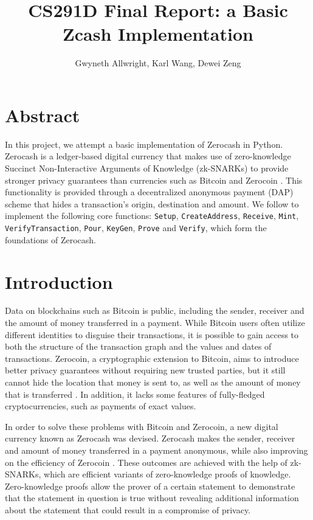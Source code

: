 \documentclass{article}
\begin{document}
\title{CS291D Final Report: a Basic Zcash Implementation}
\author{Gwyneth Allwright, Karl Wang, Dewei Zeng}

\maketitle

\section*{Abstract}
In this project, we attempt a basic implementation of Zerocash \cite{zerocash} in Python. Zerocash is a ledger-based digital currency that makes use of zero-knowledge Succinct Non-Interactive Arguments of Knowledge (zk-SNARKs) to provide stronger privacy guarantees than currencies such as Bitcoin \cite{bitcoin} and Zerocoin \cite{zerocoin}. This functionality is provided through a decentralized anonymous payment (DAP) scheme that hides a transaction's origin, destination and amount. We follow \cite{zerocash} to implement the following core functions: \texttt{Setup}, \texttt{CreateAddress}, \texttt{Receive}, \texttt{Mint}, \texttt{VerifyTransaction}, \texttt{Pour}, \texttt{KeyGen}, \texttt{Prove} and \texttt{Verify}, which form the foundations of Zerocash.

\tableofcontents

\newpage

\section{Introduction}
Data on blockchains such as Bitcoin is public, including the sender, receiver and the amount of money transferred in a payment. While Bitcoin users often utilize different identities to disguise their transactions, it is possible to gain access to both the structure of the transaction graph and the values and dates of transactions. Zerocoin, a cryptographic extension to Bitcoin, aims to introduce better privacy guarantees without requiring new trusted parties, but it still cannot hide the location that money is sent to, as well as the amount of money that is transferred \cite{zerocoin}. In addition, it lacks some features of fully-fledged cryptocurrencies, such as payments of exact values.

In order to solve these problems with Bitcoin and Zerocoin, a new digital currency known as Zerocash was devised. Zerocash makes the sender, receiver and amount of money transferred in a payment anonymous, while also improving on the efficiency of Zerocoin \cite{zerocash}. These outcomes are achieved with the help of zk-SNARKs, which are efficient variants of zero-knowledge proofs of knowledge. Zero-knowledge proofs allow the prover of a certain statement to demonstrate that the statement in question is true without revealing additional information about the statement that could result in a compromise of privacy.
\end{document}
